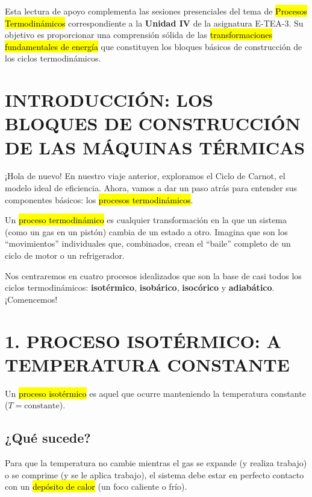 \documentclass{article}
\begin{document}

Esta lectura de apoyo complementa las sesiones presenciales del tema de \hl{Procesos Termodinámicos} correspondiente a la \textbf{Unidad IV} de la asignatura E-TEA-3. Su objetivo es proporcionar una comprensión sólida de las \hl{transformaciones fundamentales de energía} que constituyen los bloques básicos de construcción de los ciclos termodinámicos.

\vspace{5mm}

\section*{INTRODUCCIÓN: LOS BLOQUES DE CONSTRUCCIÓN DE LAS MÁQUINAS TÉRMICAS}

¡Hola de nuevo! En nuestro viaje anterior, exploramos el Ciclo de Carnot, el modelo ideal de eficiencia. Ahora, vamos a dar un paso atrás para entender sus componentes básicos: los \hl{procesos termodinámicos}.

Un \hl{proceso termodinámico} es cualquier transformación en la que un sistema (como un gas en un pistón) cambia de un estado a otro. Imagina que son los ``movimientos'' individuales que, combinados, crean el ``baile'' completo de un ciclo de motor o un refrigerador.

Nos centraremos en cuatro procesos idealizados que son la base de casi todos los ciclos termodinámicos: \textbf{isotérmico}, \textbf{isobárico}, \textbf{isocórico} y \textbf{adiabático}. ¡Comencemos!

\vspace{5mm}

\section*{1. PROCESO ISOTÉRMICO: A TEMPERATURA CONSTANTE}

Un \hl{proceso isotérmico} es aquel que ocurre manteniendo la temperatura constante ($T = \text{constante}$).

\subsection*{¿Qué sucede?}

Para que la temperatura no cambie mientras el gas se expande (y realiza trabajo) o se comprime (y se le aplica trabajo), el sistema debe estar en perfecto contacto con un \hl{depósito de calor} (un foco caliente o frío).
\end{document}
